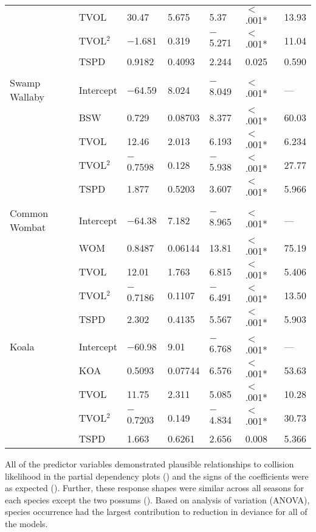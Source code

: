 \begin{table}[!t]
\begin{tabularx}{0.9\textwidth}{lllllll}
   & TVOL & 30.47 & 5.675 & 5.37 & $<$.001* & 13.93 \\ 
   & TVOL$^2$ & $-$1.681 & 0.319 & $-$5.271 & $<$.001* & 11.04 \\ 
   & TSPD & 0.9182 & 0.4093 & 2.244 & 0.025 & 0.590 \\ 
   &  &  &  &  &  &  \\ 
Swamp Wallaby & Intercept & $-$64.59 & 8.024 & $-$8.049 & $<$.001* & --- \\ 
   & BSW & 0.729 & 0.08703 & 8.377 & $<$.001* & 60.03 \\ 
   & TVOL & 12.46 & 2.013 & 6.193 & $<$.001* & 6.234 \\ 
   & TVOL$^2$ & $-$0.7598 & 0.128 & $-$5.938 & $<$.001* & 27.77 \\ 
   & TSPD & 1.877 & 0.5203 & 3.607 & $<$.001* & 5.966 \\ 
   &  &  &  &  &  &  \\ 
Common Wombat & Intercept & $-$64.38 & 7.182 & $-$8.965 & $<$.001* & --- \\ 
   & WOM & 0.8487 & 0.06144 & 13.81 & $<$.001* & 75.19 \\ 
   & TVOL & 12.01 & 1.763 & 6.815 & $<$.001* & 5.406 \\ 
   & TVOL$^2$ & $-$0.7186 & 0.1107 & $-$6.491 & $<$.001* & 13.50 \\ 
   & TSPD & 2.302 & 0.4135 & 5.567 & $<$.001* & 5.903 \\ 
   &  &  &  &  &  &  \\ 
Koala & Intercept & $-$60.98 & 9.01 & $-$6.768 & $<$.001* & --- \\ 
   & KOA & 0.5093 & 0.07744 & 6.576 & $<$.001* & 53.63 \\ 
   & TVOL & 11.75 & 2.311 & 5.085 & $<$.001* & 10.28 \\ 
   & TVOL$^2$ & $-$0.7203 & 0.149 & $-$4.834 & $<$.001* & 30.73 \\ 
   & TSPD & 1.663 & 0.6261 & 2.656 & 0.008 & 5.366 \\  
\bottomrule
\end{tabularx}
\label{6sp_sum_coll}
\end{table}

All of the predictor variables demonstrated plausible relationships to collision likelihood in the partial dependency plots () and the signs of the coefficients were as expected (). Further, these response shapes were similar across all seasons for each species except the two possums (). Based on analysis of variation (ANOVA), species occurrence had the largest contribution to reduction in deviance for all of the models.

